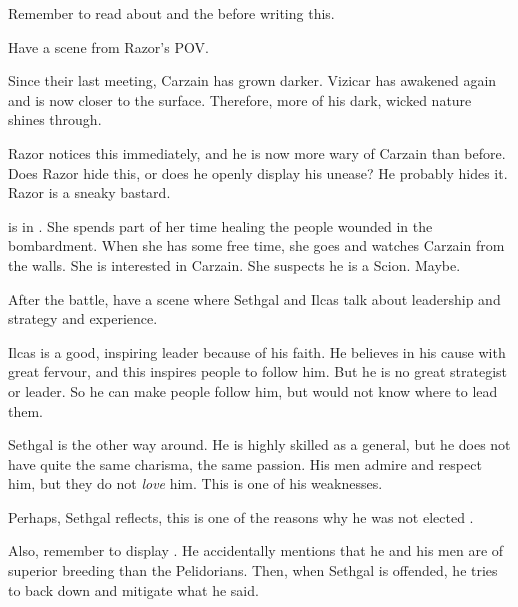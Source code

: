 Remember to read about  and the \nycans{} before writing this. 





\begin{comment}
  \section{Razor is more wary of Carzain}
\end{comment}
\new
Have a scene from Razor's POV. 

Since their last meeting, Carzain has grown darker. 
Vizicar has awakened again and is now closer to the surface. 
Therefore, more of his dark, wicked \sathariah{} nature shines through. 

Razor notices this immediately, and he is now more wary of Carzain than before. 
Does Razor hide this, or does he openly display his unease? 
He probably hides it. 
Razor is a sneaky bastard. 





\begin{comment}
  \section{Esmerel}
\end{comment}
\new
\Esmerel is in \Forclin.
She spends part of her time healing the people wounded in the bombardment.
When she has some free time, she goes and watches Carzain from the walls. 
She is interested in Carzain. 
She suspects he is a Scion. 
Maybe.





\begin{comment}
  \section{Sethgal and Ilcas}
\end{comment}
\new
After the battle, have a scene where Sethgal and Ilcas talk about leadership and strategy and experience. 

Ilcas is a good, inspiring leader because of his faith. 
He believes in his cause with great fervour, and this inspires people to follow him.
But he is no great strategist or leader. 
So he can make people follow him, but would not know where to lead them. 

Sethgal is the other way around. 
He is highly skilled as a general, but he does not have quite the same charisma, the same passion. 
His men admire and respect him, but they do not \emph{love} him. 
This is one of his weaknesses. 

Perhaps, Sethgal reflects, this is one of the reasons why he was not elected \rayuth{}. 

Also, remember to display . 
He accidentally mentions that he and his men are of superior breeding than the Pelidorians. 
Then, when Sethgal is offended, he tries to back down and mitigate what he said. 





